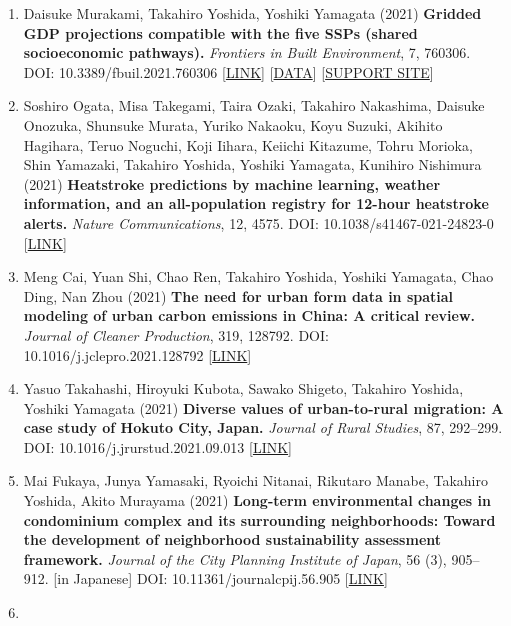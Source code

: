 \documentclass[
]{book}
\begin{document}
\begin{enumerate}
\item
  Daisuke Murakami, Takahiro Yoshida, Yoshiki Yamagata (2021)
  \textbf{Gridded GDP projections compatible with the five SSPs (shared socioeconomic pathways).}
  \emph{Frontiers in Built Environment}, 7, 760306.
  DOI: 10.3389/fbuil.2021.760306 {[}\href{https://www.frontiersin.org/articles/10.3389/fbuil.2021.760306/abstract}{LINK}{]} {[}\href{https://figshare.com/articles/dataset/Gridded_GDP_projections_compatible_with_the_five_SSPs_Shared_Socioeconomic_Pathways_/12016506/1}{DATA}{]}
  {[}\href{https://gcp-tsukuba.github.io/SSP-downscale/}{SUPPORT SITE}{]}
\item
  Soshiro Ogata, Misa Takegami, Taira Ozaki, Takahiro Nakashima, Daisuke Onozuka, Shunsuke Murata, Yuriko Nakaoku, Koyu Suzuki, Akihito Hagihara, Teruo Noguchi, Koji Iihara, Keiichi Kitazume, Tohru Morioka, Shin Yamazaki, Takahiro Yoshida, Yoshiki Yamagata, Kunihiro Nishimura (2021)
  \textbf{Heatstroke predictions by machine learning, weather information, and an all-population registry for 12-hour heatstroke alerts.}
  \emph{Nature Communications}, 12, 4575.
  DOI: 10.1038/s41467-021-24823-0 {[}\href{https://www.nature.com/articles/s41467-021-24823-0}{LINK}{]}
\item
  Meng Cai, Yuan Shi, Chao Ren, Takahiro Yoshida, Yoshiki Yamagata, Chao Ding, Nan Zhou (2021)
  \textbf{The need for urban form data in spatial modeling of urban carbon emissions in China: A critical review.}
  \emph{Journal of Cleaner Production}, 319, 128792.
  DOI: 10.1016/j.jclepro.2021.128792 {[}\href{https://doi.org/10.1016/j.jclepro.2021.128792}{LINK}{]}
\item
  Yasuo Takahashi, Hiroyuki Kubota, Sawako Shigeto, Takahiro Yoshida, Yoshiki Yamagata (2021)
  \textbf{Diverse values of urban-to-rural migration: A case study of Hokuto City, Japan.}
  \emph{Journal of Rural Studies}, 87, 292--299.
  DOI: 10.1016/j.jrurstud.2021.09.013 {[}\href{https://www.sciencedirect.com/science/article/abs/pii/S0743016721002771}{LINK}{]}
\item
  Mai Fukaya, Junya Yamasaki, Ryoichi Nitanai, Rikutaro Manabe, Takahiro Yoshida, Akito Murayama (2021)
  \textbf{Long-term environmental changes in condominium complex and its surrounding neighborhoods: Toward the development of neighborhood sustainability assessment framework.}
  \emph{Journal of the City Planning Institute of Japan}, 56 (3), 905--912. {[}in Japanese{]}
  DOI: 10.11361/journalcpij.56.905 {[}\href{https://www.jstage.jst.go.jp/article/journalcpij/56/3/56_905/_article/-char/en}{LINK}{]}
\item

\end{enumerate}
\end{document}
